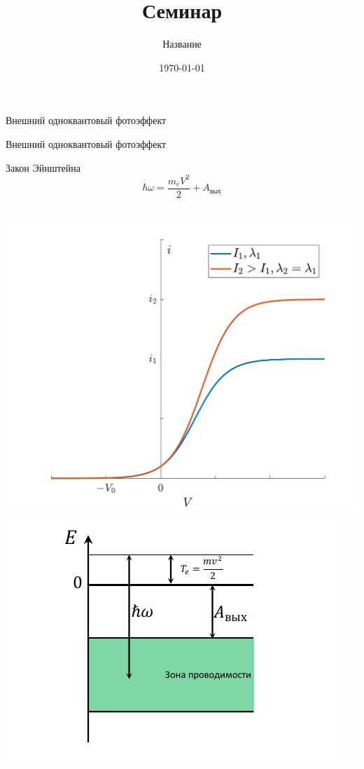 \documentclass[12]{beamer}
\title{Семинар }
\subtitle{Название}
\author{}
\date{\today}
\institute {\large 
\textbf{Ключевые слова}: \\[6pt] 

\\[6pt] 
\textbf{Задачи}: \\[6pt] 

}
\begin{document}
\maketitle


\begin{frame}[t]{Внешний одноквантовый фотоэффект}

\end{frame}

\begin{frame}[t]{Внешний одноквантовый фотоэффект}
\begin{block}{Закон Эйнштейна}
\begin{equation*}
    \hbar \omega = \dfrac{m_eV^2}{2} + A_{\text{вых}}
\end{equation*}
\end{block}
\begin{columns}[onlytextwidth]
\includegraphics[width=\textwidth]{Seminar_02/pics/pic_01.pdf}
\includegraphics[width=\textwidth]{Seminar_02/pics/pic_02.pdf}
\end{columns}
\end{frame}
\end{document}
